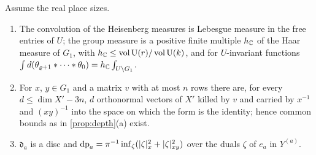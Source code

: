 \begin{proposition}\label{prop:complex-place}
Assume the real place sizes.
\begin{enumerate}[label=\textup{(\alph*)}]
\item The convolution of the Heisenberg measures is Lebesgue measure in the free entries of $U$; the group measure is a positive finite multiple $h_{\mathbb{C}}$ of the Haar measure of $G_1$, with $h_{\mathbb{C}}\le\operatorname{vol}\operatorname{U}(r)/\operatorname{vol}\operatorname{U}(k)$, and
for $U$-invariant functions $\int d(\theta_{\varrho+1}*\dots*\theta_0)=h_{\mathbb{C}}\int_{U\backslash G_1}$.
\item For $x$, $y\in G_1$ and a matrix $v$ with at most $n$ rows there are, for every $d\le\dim X'-3n$, $d$ orthonormal vectors of $X'$ killed by $v$ and carried by $x^{-1}$ and $(xy)^{-1}$ into the space on
which the form is the identity; hence common bounds as in \cref{prop:depth}(a) exist.
\item $\mathfrak d_a$ is a disc and $\mathrm{dp}_a=\pi^{-1}\inf_\zeta(\lvert \zeta\rvert_x^2+\lvert \zeta\rvert_{xy}^2)$ over the duals $\zeta$ of $e_a$ in $Y^{(a)}$.
\end{enumerate}
\end{proposition}


